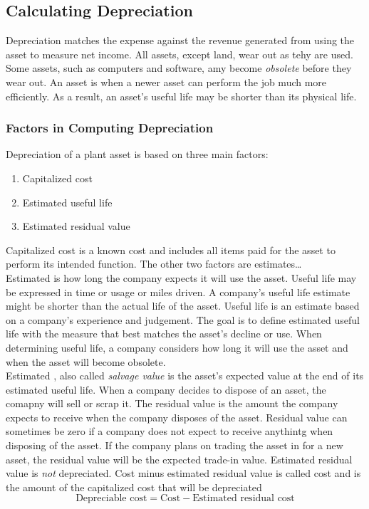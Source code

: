 \documentclass{article}
\begin{document}
\subsection{Calculating Depreciation}

Depreciation matches the expense against the revenue generated from using the asset to measure net income. All assets, except land, wear out as tehy are used. Some assets, such as computers and software, amy become \emph{obsolete} before they wear out. An asset is  when a newer asset can perform the job much more efficiently. As a result, an asset's useful life may be shorter than its physical life. \\ 

\subsubsection{Factors in Computing Depreciation}

Depreciation of a plant asset is based on three main factors:
\begin{enumerate}
  \item Capitalized cost 
  \item Estimated useful life 
  \item Estimated residual value
\end{enumerate}
Capitalized cost is a known cost and includes all items paid for the asset to perform its intended function. The other two factors are estimates\dots \\ 

Estimated  is how long the company expects it will use the asset. Useful life may be expressed in time or usage or miles driven. A company's useful life estimate might be shorter than the actual life of the asset. Useful life is an estimate based on a company's experience and judgement. The goal is to define estimated useful life with the measure that best matches the asset's decline or use. When determining useful life, a company considers how long it will use the asset and when the asset will become obsolete. \\ 

Estimated , also called \emph{salvage value} is the asset's expected value at the end of its estimated useful life. When a company decides to dispose of an asset, the comapny will sell or scrap it. The residual value is the amount the company expects to receive when the company disposes of the asset. Residual value can sometimes be zero if a company does not expect to receive anythintg when disposing of the asset. If the company plans on trading the asset in for a new asset, the residual value will be the expected trade-in value. Estimated residual value is \emph{not} depreciated. Cost minus estimated residual value is called  cost and is the amount of the capitalized cost that will be depreciated $$\textrm{Depreciable cost} = \textrm{Cost} - \textrm{Estimated residual cost}$$ 
\end{document}
